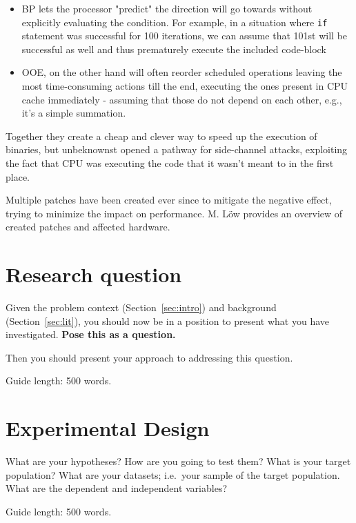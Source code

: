 \documentclass{csfourzero}
\begin{document}
\begin{itemize}
  \item BP lets the processor "predict" the direction will go towards without explicitly evaluating the condition. For example, in a situation where \lstinline{if} statement was successful for 100 iterations, we can assume that 101st will be successful as well and thus prematurely execute the included code-block  

  \item OOE, on the other hand will often reorder scheduled operations leaving the most time-consuming actions till the end, executing the ones present in CPU cache immediately - assuming that those do not depend on each other, e.g., it's a simple summation.
\end{itemize}

Together they create a cheap and clever way to speed up the execution of binaries, but unbeknownst opened a pathway for side-channel attacks, exploiting the fact that CPU was executing the code that it wasn't meant to in the first place. 

Multiple patches have been created ever since to mitigate the negative effect, trying to minimize the impact on performance. M. L{\"o}w \cite{low2018overview} provides an overview of created patches and affected hardware.



\section{Research question}
\label{sec:rq}

Given the problem context (Section~\ref{sec:intro}) and background
(Section~\ref{sec:lit}), you should now be in a position to present
what you have investigated. \textbf{Pose this as a question.}

Then you should present your approach to addressing this
question.

Guide length: 500 words.

\section{Experimental Design}
\label{sec:exp}

What are your hypotheses? How are you going to test them? What is your
target population? What are your datasets; i.e.\ your sample of the
target population. What are the dependent and independent variables?

Guide length: 500 words.
\end{document}
